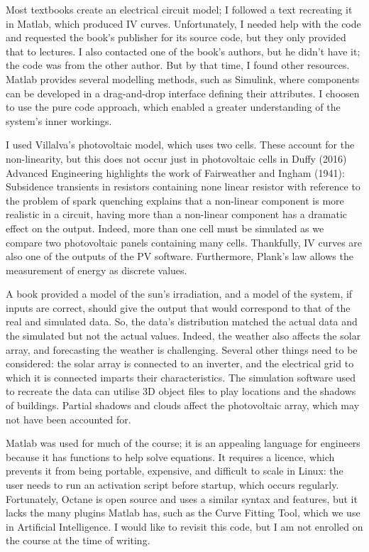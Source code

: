 \documentclass{article}
\begin{document}
Most textbooks create an electrical circuit model; I followed a text recreating it in Matlab, which produced IV curves. Unfortunately, I needed help with the code and requested the book's publisher for its source code, but they only provided that to lectures. I also contacted one of the book's authors, but he didn't have it; the code was from the other author. But by that time, I found other resources. Matlab provides several modelling methods, such as Simulink, where components can be developed in a drag-and-drop interface defining their attributes. I choosen to use the pure code approach, which enabled a greater understanding of the system's inner workings. 

I used Villalva's photovoltaic model, which uses two cells. These account for the non-linearity, but this does not occur just in photovoltaic cells in Duffy (2016) Advanced Engineering highlights the work of Fairweather and Ingham (1941): Subsidence transients in resistors containing none linear resistor with reference to the problem of spark quenching explains that a non-linear component is more realistic in a circuit, having more than a non-linear component has a dramatic effect on the output. Indeed, more than one cell must be simulated as we compare two photovoltaic panels containing many cells. Thankfully, IV curves are also one of the outputs of the PV software. Furthermore, Plank's law allows the measurement of energy as discrete values. 

A book provided a model of the sun's irradiation, and a model of the system, if inputs are correct, should give the output that would correspond to that of the real and simulated data. So, the data's distribution matched the actual data and the simulated but not the actual values. Indeed, the weather also affects the solar array, and forecasting the weather is challenging. Several other things need to be considered: the solar array is connected to an inverter, and the electrical grid to which it is connected imparts their characteristics. The simulation software used to recreate the data can utilise 3D object files to play locations and the shadows of buildings. Partial shadows and clouds affect the photovoltaic array, which may not have been accounted for. 

Matlab was used for much of the course; it is an appealing language for engineers because it has functions to help solve equations. It requires a licence, which prevents it from being portable, expensive, and difficult to scale in Linux: the user needs to run an activation script before startup, which occurs regularly. Fortunately, Octane is open source and uses a similar syntax and features, but it lacks the many plugins Matlab has, such as the Curve Fitting Tool, which we use in Artificial Intelligence. I would like to revisit this code, but I am not enrolled on the course at the time of writing.
\end{document}
